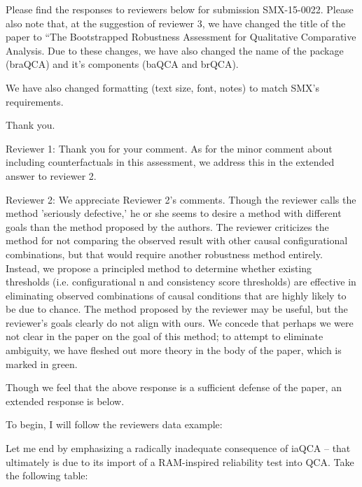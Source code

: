 \documentclass[10pt,stdletter,dateno,sigleft]{newlfm} %
\begin{document}
\begin{newlfm}


Please find the responses to reviewers below for submission SMX-15-0022. Please also note that, at the suggestion of reviewer 3, we have changed the title of the paper to ``The Bootstrapped Robustness Assessment for Qualitative Comparative Analysis. Due to these changes, we have also changed the name of the package (braQCA) and it's components (baQCA and brQCA).

We have also changed formatting (text size, font, notes) to match SMX's requirements. 

Thank you. 

Reviewer 1: Thank you for your comment. As for the minor comment about including counterfactuals in this assessment, we address this in the extended answer to reviewer 2. 

Reviewer 2: We appreciate Reviewer 2's comments. Though the reviewer calls the method 'seriously defective,' he or she seems to desire a method with different goals than the method proposed by the authors. The reviewer criticizes the method for not comparing the observed result with other causal configurational combinations, but that would require another robustness method entirely. Instead, we propose a principled method to determine whether existing thresholds (i.e. configurational n and consistency score thresholds) are effective in eliminating observed combinations of causal conditions that are highly likely to be due to chance. The method proposed by the reviewer may be useful, but the reviewer's goals clearly do not align with ours. We concede that perhaps we were not clear in the paper on the goal of this method; to attempt to eliminate ambiguity, we have fleshed out more theory in the body of the paper, which is marked in green. 

Though we feel that the above response is a sufficient defense of the paper, an extended response is below. 

To begin, I will follow the reviewers data example: 

\begin{displayquote}
Let me end by emphasizing a radically inadequate consequence of iaQCA -- that ultimately is due to its import of a RAM-inspired reliability test into QCA. Take the following table:


\end{displayquote}
\end{newlfm}
\end{document}
